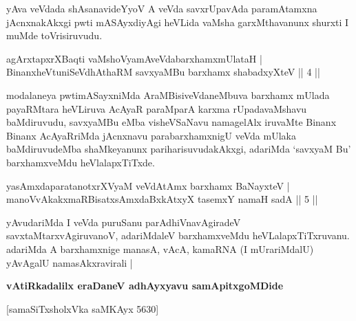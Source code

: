 \begin{artha}
yAva veVdada shAsanavideYyoV A veVda savxrUpavAda paramAtamxna jAcnxnakAkxgi pwti mASAyxdiyAgi heVLida vaMsha garxMthavanunx shurxti I muMde toVrisiruvudu.
\end{artha}

\begin{shl}
agArxtapxrXBaqti vaMshoV\s yamAveVdabarxhamxmUlataH |\\
BinanxheVtuniSeVdhAthaRM savxyaMBu barxhamx shabadxyXteV \hfill || 4 ||
\end{shl}

\begin{artha}
modalaneya pwtimASayxniMda AraMBisiveVdaneMbuva barxhamx mUlada
 payaRMtara heVLiruva AcAyaR paraMparA karxma rUpadavaMshavu
baMdiruvudu, savxyaMBu eMba visheVSaNavu namagelAlx iruvaMte Binanx
Binanx AcAyaRriMda jAcnxnavu parabarxhamxnigU veVda mUlaka
baMdiruvudeMba shaMkeyanunx pariharisuvudakAkxgi, adariMda `savxyaM Bu'
barxhamxveMdu heVlalapxTiTxde.
\end{artha}

\begin{shl}\footnotemark[1]yasAmxdaparatanotxrXV\s yaM veVdAtAmx barxhamx BaNayxteV |\\
manoVvAkakxmaRBisatxsAmxdaBxkAtxyX tasemxY namaH sadA \hfill || 5 ||
\end{shl}

\begin{artha}
yAvudariMda I veVda puruSanu parAdhiVnavAgiradeV
savxtaMtarxvAgiruvanoV, adariMdaleV barxhamxveMdu
heVLalapxTiTxruvanu. adariMda A barxhamxnige manasA, vAcA, kamaRNA
(I mUrariMdalU) yAvAgalU namasAkxravirali |
\end{artha}

\begin{center}
\textbf{vAtiRkadalilx eraDaneV adhAyxyavu samApitxgoMDide }

\medskip

 [samaSiTxsholxVka saMKAyx 5630]
\end{center}

